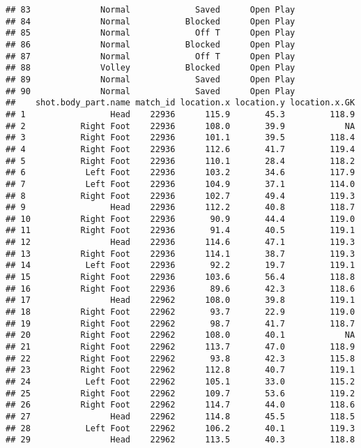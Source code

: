 \documentclass[]{article}
\begin{document}
\begin{verbatim}
## 83              Normal             Saved      Open Play
## 84              Normal           Blocked      Open Play
## 85              Normal             Off T      Open Play
## 86              Normal           Blocked      Open Play
## 87              Normal             Off T      Open Play
## 88              Volley           Blocked      Open Play
## 89              Normal             Saved      Open Play
## 90              Normal             Saved      Open Play
##    shot.body_part.name match_id location.x location.y location.x.GK
## 1                 Head    22936      115.9       45.3         118.9
## 2           Right Foot    22936      108.0       39.9            NA
## 3           Right Foot    22936      101.1       39.5         118.4
## 4           Right Foot    22936      112.6       41.7         119.4
## 5           Right Foot    22936      110.1       28.4         118.2
## 6            Left Foot    22936      103.2       34.6         117.9
## 7            Left Foot    22936      104.9       37.1         114.0
## 8           Right Foot    22936      102.7       49.4         119.3
## 9                 Head    22936      112.2       40.8         118.7
## 10          Right Foot    22936       90.9       44.4         119.0
## 11          Right Foot    22936       91.4       40.5         119.1
## 12                Head    22936      114.6       47.1         119.3
## 13          Right Foot    22936      114.1       38.7         119.3
## 14           Left Foot    22936       92.2       19.7         119.1
## 15          Right Foot    22936      103.6       56.4         118.8
## 16          Right Foot    22936       89.6       42.3         118.6
## 17                Head    22962      108.0       39.8         119.1
## 18          Right Foot    22962       93.7       22.9         119.0
## 19          Right Foot    22962       98.7       41.7         118.7
## 20          Right Foot    22962      108.0       40.1            NA
## 21          Right Foot    22962      113.7       47.0         118.9
## 22          Right Foot    22962       93.8       42.3         115.8
## 23          Right Foot    22962      112.8       40.7         119.1
## 24           Left Foot    22962      105.1       33.0         115.2
## 25          Right Foot    22962      109.7       53.6         119.2
## 26          Right Foot    22962      114.7       44.0         118.6
## 27                Head    22962      114.8       45.5         118.5
## 28           Left Foot    22962      106.2       40.1         119.3
## 29                Head    22962      113.5       40.3         118.8

\end{verbatim}
\end{document}

